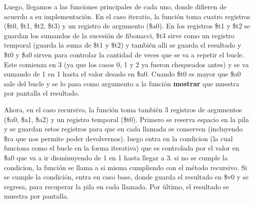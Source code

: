 \documentclass{article}
\begin{document}
Luego, llegamos a las funciones principales de cada uno, donde difieren de acuerdo a su implementación. En el caso iteratio, la función toma cuatro registros (\$t0, \$t1, \$t2, \$t3) y un registro de argumento (\$a0). En los registros \$t1 y \$t2 se guardan los sumandos de la sucesión de fibonacci, \$t3 sirve como un registro temporal (guarda la suma de \$t1 y \$t2) y también alli se guarda el resultado y \$t0 y \$a0 sirven para controlar la cantidad de veces que se va a repetir el bucle. Este comienza en 3 (ya que los casos 0, 1 y 2 ya fueron chequeados antes) y se va sumando de 1 en 1 hasta el valor desado en \$a0. Cuando \$t0 es mayor que \$a0 sale del bucle y se lo pasa como argumento a la función \textbf{mostrar} que muestra por pantalla el resultado.\newline

Ahora, en el caso recursivo, la función toma también 3 registros de argumentos (\$a0, \$a1, \$a2) y un registro temporal (\$t0). Primero se reserva espacio en la pila y se guardan estos registros para que en cada llamada se conserven (incluyendo \$ra que nos permite poder devolvernos). luego entra en la condicion (la cual funciona como el bucle en la forma iterativa) que es controlada por el valor en \$a0 que va a ir disminuyendo de 1 en 1 hasta llegar a 3. si no se cumple la condicion, la función se llama a si misma cumpliendo con el método recursivo. Si se cumple la condición, entra en caso base, donde guarda el resultado en \$v0 y se regresa, para recuperar la pila en cada llamada. Por último, el resultado se muestra por pantalla.
\endgroup
\end{document}
